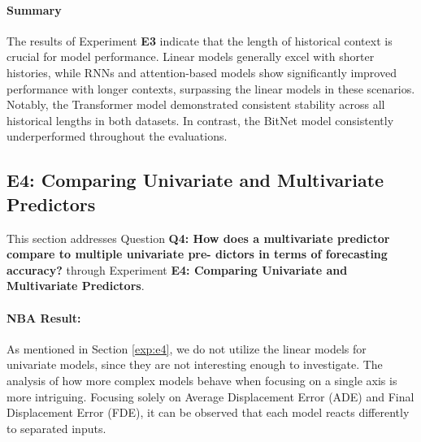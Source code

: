 \paragraph{Summary} The results of Experiment \textbf{E3} indicate that the length of historical context is crucial for model performance. Linear models generally excel with shorter histories, while RNNs and attention-based models show significantly improved performance with longer contexts, surpassing the linear models in these scenarios. Notably, the Transformer model demonstrated consistent stability across all historical lengths in both datasets. In contrast, the BitNet model consistently underperformed throughout the evaluations.


\subsection{E4: Comparing Univariate and Multivariate Predictors}
\label{exp:uni_multi}

This section addresses Question \textbf{Q4: How does a multivariate predictor compare to multiple univariate pre-
dictors in terms of forecasting accuracy?} through Experiment \textbf{E4: Comparing Univariate and Multivariate Predictors}.
\paragraph {NBA Result:}

As mentioned in Section \ref{exp:e4}, we do not utilize the linear models for univariate models, since they are not interesting enough to investigate. The analysis of how more complex models behave when focusing on a single axis is more intriguing. Focusing solely on Average Displacement Error (ADE) and Final Displacement Error (FDE), it can be observed that each model reacts differently to separated inputs.


